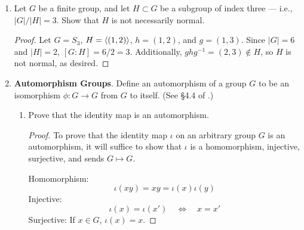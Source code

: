 \documentclass[../psets.tex]{subfiles}
\begin{document}
\begin{enumerate}
\begin{proof}
        To prove that $H$ is normal, it will suffice to show that $gH=Hg$ for all $g\in G$. Let $g\in G$ be arbitrary. We divide into two cases ($g\in H$ and $g\notin H$).\par
        Suppose first that $g\in H$. Let $gh\in gH$ be arbitrary. Then by closure under multiplication, $gh\in H$. Choosing $h'=ghg^{-1}\in H$, it follows that $gh=h'g\in Hg$, as desired. The proof that $gH\supset Hg$ is analogous.\par
        Now suppose that $g\notin H$. Since $[G:H]=2$, $G$ can be partitioned into the disjoint union of $H$ and the coset $gH$ or, symmetrically, $H$ and the coset $Hg$. It follows that
        \begin{equation*}
            gH = G\setminus H = Hg
        \end{equation*}
        as desired.
    \end{proof}
    \item Let $G$ be a finite group, and let $H\subset G$ be a subgroup of index three --- i.e., $|G|/|H|=3$. Show that $H$ is not necessarily normal.
    \begin{proof}
        Let $G=S_3$, $H=\left\langle{(1,2)}\right\rangle$, $h=(1,2)$, and $g=(1,3)$. Since $|G|=6$ and $|H|=2$, $[G:H]=6/2=3$. Additionally, $ghg^{-1}=(2,3)\notin H$, so $H$ is not normal, as desired.
    \end{proof}
    \item \textbf{Automorphism Groups}. Define an automorphism of a group $G$ to be an isomorphism $\phi:G\to G$ from $G$ to itself. (See \S 4.4 of \textcite{bib:DummitFoote}.)
    \begin{enumerate}
        \item Prove that the identity map is an automorphism.
        \begin{proof}
            To prove that the identity map $\iota$ on an arbitrary group $G$ is an automorphism, it will suffice to show that $\iota$ is a homomorphism, injective, surjective, and sends $G\mapsto G$.\par
            Homomorphism:
            \begin{equation*}
                \iota(xy) = xy = \iota(x)\iota(y)
            \end{equation*}
            Injective:
            \begin{equation*}
                \iota(x) = \iota(x')
                \quad\Longleftrightarrow\quad
                x = x'
            \end{equation*}
            Surjective: If $x\in G$, $\iota(x)=x$.\par

\end{proof}
\end{enumerate}
\end{enumerate}
\end{document}
